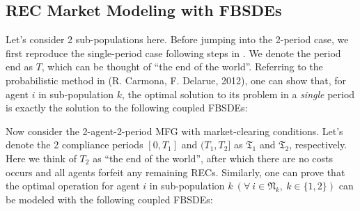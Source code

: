 \documentclass[a4paper,10pt]{article}
\newcommand{\1}{\mathbf{1}}
\begin{document}
\subsection{REC Market Modeling with
FBSDEs}\label{rec-market-modeling}

Let's consider 2 sub-populations here. Before jumping into the 2-period
case, we first reproduce the single-period case following steps in \cite{SC}. We
denote the period end as \(T\), which can be thought of ``the end of the
world''. Referring to the probabilistic method in \cite{RC} (R. Carmona, F. Delarue,
2012), one can show that, for agent \(i\) in sub-population \(k\), the
optimal solution to its problem in a \emph{single} period is exactly the
solution to the following coupled FBSDEs:


Now consider the 2-agent-2-period MFG with market-clearing conditions.
Let's denote the 2 compliance periods \([0,T_1]\) and \((T_1,T_2]\) as
\(\mathfrak{T_1}\) and \(\mathfrak{T_2}\), respectively. Here we think
of \(T_2\) as ``the end of the world'', after which there are no costs
occurs and all agents forfeit any remaining RECs. Similarly, one can
prove that the optimal operation for agent \(i\) in sub-population
\(k~(\forall~i \in \mathfrak{N}_k,~k\in\lbrace{1,2\rbrace})\) can be
modeled with the following coupled FBSDEs:
\end{document}
